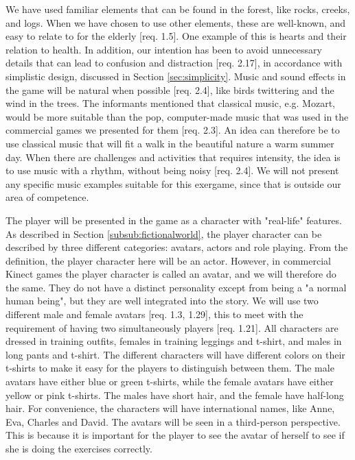 We have used familiar elements that can be found in the forest, like rocks, creeks, and logs. When we have chosen to use other elements, these are well-known, and easy to relate to for the elderly [req. 1.5]. One example of this is hearts and their relation to health. In addition, our intention has been to avoid unnecessary details that can lead to confusion and distraction [req. 2.17], in accordance with simplistic design, discussed in Section \ref{sec:simplicity}. Music and sound effects in the game will be natural when possible [req. 2.4], like birds twittering and the wind in the trees. The informants mentioned that classical music, e.g. Mozart, would be more suitable than the pop, computer-made music that was used in the commercial games we presented for them [req. 2.3]. An idea can therefore be to use classical music that will fit a walk in the beautiful nature a warm summer day. When there are challenges and activities that requires intensity, the idea is to use music with a rhythm, without being noisy [req. 2.4]. We will not present any specific music examples suitable for this exergame, since that is outside our area of competence. 

The player will be presented in the game as a character with "real-life" features. As described in Section \ref{subsub:fictionalworld}, the player character can be described by three different categories: avatars, actors and role playing. From the definition, the player character here will be an actor. However, in commercial Kinect games the player character is called an avatar, and we will therefore do the same. They do not have a distinct personality except from being a "a normal human being", but they are well integrated into the story. We will use two different male and female avatars [req. 1.3, 1.29], this to meet with the requirement of having two simultaneously players [req. 1.21]. All characters are dressed in training outfits, females in training leggings and t-shirt, and males in long pants and t-shirt. The different characters will have different colors on their t-shirts to make it easy for the players to distinguish between them. The male avatars have either blue or green t-shirts, while the female avatars have either yellow or pink t-shirts. The males have short hair, and the female have half-long hair. For convenience, the characters will have international names, like Anne, Eva, Charles and David. The avatars will be seen in a third-person perspective. This is because it is important for the player to see the avatar of herself to see if she is doing the exercises correctly. 


